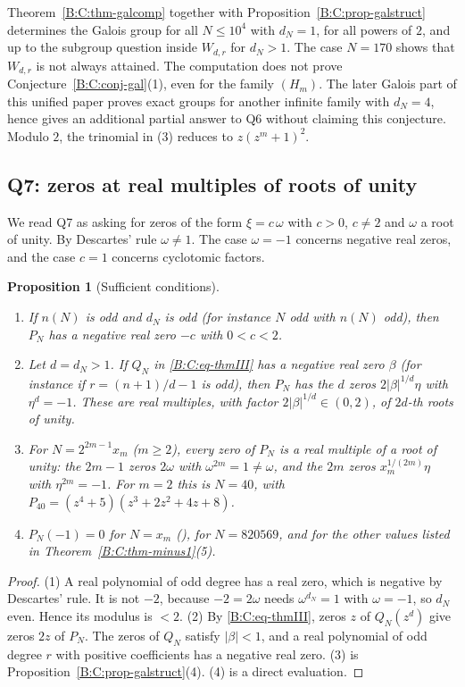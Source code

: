 \documentclass[11pt,a4paper]{article}
\newtheorem{proposition}[theorem]{Proposition}
\theoremstyle{definition}
\theoremstyle{remark}
\numberwithin{equation}{section}
\begin{document}
Theorem~\ref{B:C:thm-galcomp} together with Proposition~\ref{B:C:prop-galstruct}
determines the Galois group for all $N\le10^4$ with $d_N=1$, for all powers of
$2$, and up to the subgroup question inside $W_{d,r}$ for $d_N>1$.  The case
$N=170$ shows that $W_{d,r}$ is not always attained.  The computation does not prove Conjecture~\ref{B:C:conj-gal}(1), even for
the family $(H_m)$. The later Galois part of this unified paper proves exact
groups for another infinite family with $d_N=4$, hence gives an additional
partial answer to Q6 without claiming this conjecture. Modulo $2$, the
trinomial in (3) reduces to $z(z^m+1)^2$.

\subsection{Q7: zeros at real multiples of roots of unity}\label{B:C:ssec-Q7}

We read Q7 as asking for zeros of the form $\xi=c\,\omega$ with $c>0$, $c\ne2$ and
$\omega$ a root of unity.  By Descartes' rule $\omega\ne1$.  The case
$\omega=-1$ concerns negative real zeros, and the case $c=1$ concerns
cyclotomic factors.

\begin{proposition}[Sufficient conditions]\label{B:C:prop-Q7-suff}
\leavevmode
\begin{enumerate}
\item If $n(N)$ is odd and $d_N$ is odd (for instance $N$ odd with $n(N)$ odd),
then $P_N$ has a negative real zero $-c$ with $0<c<2$.
\item Let $d=d_N>1$.  If $Q_N$ in \eqref{B:C:eq-thmIII} has a negative real zero
$\beta$ (for instance if $r=(n+1)/d-1$ is odd), then $P_N$ has the $d$ zeros
$2|\beta|^{1/d}\eta$ with $\eta^d=-1$.  These are real multiples, with factor
$2|\beta|^{1/d}\in(0,2)$, of $2d$-th roots of unity.
\item For $N=2^{2m-1}x_m$ ($m\ge2$), every zero of $P_N$ is a real multiple of a
root of unity: the $2m-1$ zeros $2\omega$ with $\omega^{2m}=1\ne\omega$, and the
$2m$ zeros $x_m^{1/(2m)}\eta$ with $\eta^{2m}=-1$.  For $m=2$ this is
$N=40$, with $P_{40}=(z^4+5)(z^3+2z^2+4z+8)$.
\item $P_N(-1)=0$ for $N=x_m$ (\cite[Thm.~7]{R025}), for $N=820569$, and for
the other values listed in Theorem~\ref{B:C:thm-minus1}(5).
\end{enumerate}
\end{proposition}

\begin{proof}
(1) A real polynomial of odd degree has a real zero, which is negative by
Descartes' rule.  It is not $-2$, because $-2=2\omega$ needs $\omega^{d_N}=1$
with $\omega=-1$, so $d_N$ even.  Hence its modulus is $<2$.
(2) By \eqref{B:C:eq-thmIII}, zeros $z$ of $Q_N(z^d)$ give zeros $2z$ of $P_N$.
The zeros of $Q_N$ satisfy $|\beta|<1$, and a real polynomial of odd degree $r$
with positive coefficients has a negative real zero.
(3) is Proposition~\ref{B:C:prop-galstruct}(4).
(4) is a direct evaluation.
\end{proof}
\end{document}
